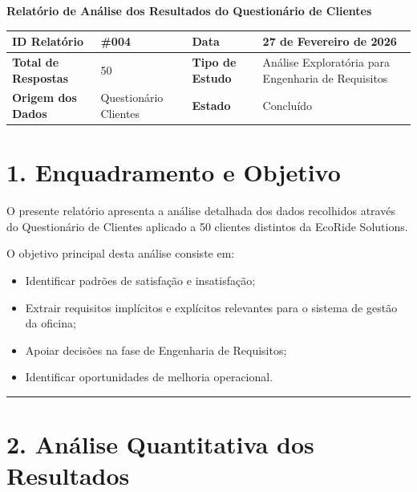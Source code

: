 \documentclass[11pt,a4paper]{article}
\begin{document}
	
{\noindent\LARGE\bfseries\color{primaryblue} Relatório de Análise dos Resultados do Questionário de Clientes}
\\[0.5cm]

\renewcommand{\arraystretch}{1.5}
\begin{tabularx}{\textwidth}{@{}|l|X|l|X|@{}}
	\hline
	\rowcolor{gray!10} \textbf{ID Relatório} & \#004 & \textbf{Data} & 27 de Fevereiro de 2026 \\ \hline
	\textbf{Total de Respostas} & 50 & \textbf{Tipo de Estudo} & Análise Exploratória para Engenharia de Requisitos \\ \hline
	\textbf{Origem dos Dados} & Questionário Clientes & \textbf{Estado} & Concluído \\ \hline
\end{tabularx}

\vspace{0.8cm}

\section*{1. Enquadramento e Objetivo}

O presente relatório apresenta a análise detalhada dos dados recolhidos através do Questionário de Clientes aplicado a 50 clientes distintos da EcoRide Solutions. 

O objetivo principal desta análise consiste em:

\begin{itemize}[leftmargin=*, label=\small\color{primaryblue}$\blacksquare$]
	\item Identificar padrões de satisfação e insatisfação;
	\item Extrair requisitos implícitos e explícitos relevantes para o sistema de gestão da oficina;
	\item Apoiar decisões na fase de Engenharia de Requisitos;
	\item Identificar oportunidades de melhoria operacional.
\end{itemize}

\hrule
\vspace{0.6cm}

\section*{2. Análise Quantitativa dos Resultados}
\end{document}
